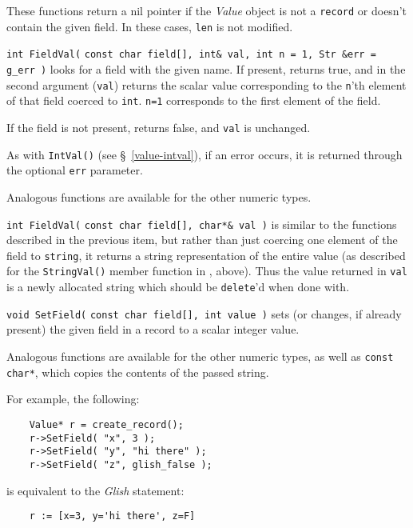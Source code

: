 \begin{sloppy}
\begin{list}{}{}
These functions return
a nil pointer if the {\em Value} object is not a {\tt record}
or doesn't contain the given field.  In these cases, {\tt len} is not modified.

\item[{\tt int FieldVal(}] {\tt const char field[], int\& val, int n = 1, Str \&err = g\_err )}
looks for a field with the given name.  If present, returns true, and
in the second argument ({\tt val}) returns the scalar value corresponding
to the {\tt n}'th element of that field coerced to {\tt int}.  {\tt n=1}
corresponds to the first element of the field.

If the field is not present, returns false, and {\tt val} is unchanged.

As with {\tt IntVal()} (see \S~\ref{value-intval}), if an error occurs, it
is returned through the optional {\tt err} parameter.

Analogous functions are available for the other numeric types.

\item[{\tt int FieldVal(}] {\tt const char field[], char*\& val )} is
similar to the functions described in the previous item, but rather than
just coercing one element of the field to {\tt string}, it returns
a string representation of the entire value (as described for the
{\tt StringVal()} member function in , above).
Thus the value returned in {\tt val} is a newly allocated string which
should be {\tt delete}'d when done with.

\item[{\tt void SetField(}] {\tt const char field[], int value )} sets (or
changes, if already present) the given field in a record to a scalar
integer value.

Analogous functions are available for the other numeric types, as well
as {\tt const char*}, which copies the contents of the passed string.

For example, the following:
\begin{verbatim}
    Value* r = create_record();
    r->SetField( "x", 3 );
    r->SetField( "y", "hi there" );
    r->SetField( "z", glish_false );
\end{verbatim}
is equivalent to the {\em Glish} statement:
\begin{verbatim}
    r := [x=3, y='hi there', z=F]
\end{verbatim}


\end{list}
\end{sloppy}
